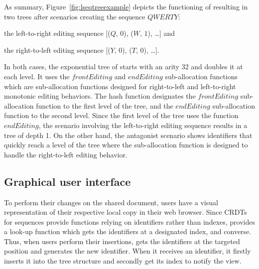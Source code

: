 \begin{asparadesc}
\item [As summary,] Figure~\ref{fig:lseqtreeexample} depicts the functioning of
  \LSEQ resulting in two trees after scenarios creating the sequence $QWERTY$:
  \begin{inparaenum}[(i)] 
  \item the left-to-right editing sequence [($Q,\,0$), ($W,\,1$), \ldots] and
  \item the right-to-left editing sequence [($Y,\,0$), ($T,\,0$), \ldots].
  \end{inparaenum}
  In both cases, the exponential tree of \LSEQ starts with an arity $32$ and
  doubles it at each level. It uses the $frontEditing$ and $endEditing$
  sub-allocation functions which are sub-allocation functions designed for
  right-to-left and left-to-right monotonic editing behaviors. The hash function
  designates the $frontEditing$ sub-allocation function to the first level of
  the tree, and the $endEditing$ sub-allocation function to the second
  level. Since the first level of the tree uses the function $endEditing$, the
  scenario involving the left-to-right editing sequence results in a tree of
  depth 1. On the other hand, the antagonist scenario shows \LSEQ identifiers
  that quickly reach a level of the tree where the sub-allocation function is
  designed to handle the right-to-left editing behavior.
\end{asparadesc}

\subsection{Graphical user interface}

To perform their changes on the shared document, users have a visual
representation of their respective local copy in their web browser.  Since CRDTs
for sequences provide functions relying on identifiers rather than indexes,
\CRATE provides a look-up function which gets the identifiers at a designated
index, and converse.  Thus, when users perform their insertions, \CRATE gets the
identifiers at the targeted position and generates the new identifier. When it
receives an identifier, it firstly inserts it into the tree structure and
secondly get its index to notify the view.

%   

